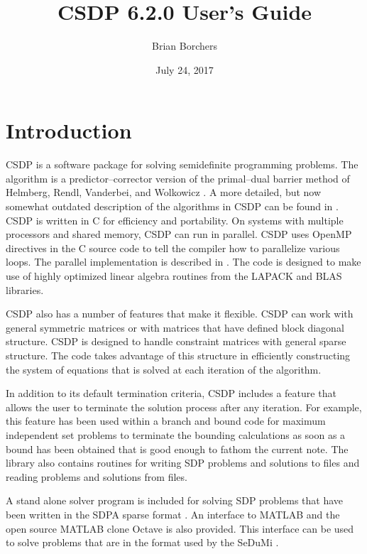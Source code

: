 \documentclass{article}
\begin{document}
\title{CSDP 6.2.0 User's Guide}
\date{July 24, 2017}
\author{Brian Borchers}
\maketitle
\section*{Introduction}
CSDP is a software package for solving semidefinite programming
problems.  The algorithm is a predictor--corrector version of the
primal--dual barrier method of Helmberg, Rendl, Vanderbei, and
Wolkowicz \cite{HelmbergC:Anims}.  A more detailed, but now somewhat
outdated description of the algorithms in CSDP can be found in
\cite{BorchersB:CSDCls}.  CSDP is written in C for efficiency and
portability.  On systems with multiple processors and shared memory,
CSDP can run in parallel.  CSDP uses OpenMP directives in the C source
code to tell the compiler how to parallelize various loops.  The
parallel implementation is described in
\cite{borchers2007implementation}.  The code is designed to make use
of highly optimized linear algebra routines from the LAPACK and BLAS
libraries.

CSDP also has a number of features that make it flexible.  CSDP
can work with general symmetric matrices or with matrices that have
defined block diagonal structure.  CSDP is designed to handle
constraint matrices with general sparse structure.  The code takes
advantage of this structure in efficiently constructing the system of
equations that is solved at each iteration of the algorithm.  

In addition to its default termination criteria, CSDP includes a
feature that allows the user to terminate the solution process after
any iteration.  For example, this feature has been used within a
branch and bound code for maximum independent set problems to
terminate the bounding calculations as soon as a bound has been
obtained that is good enough to fathom the current note.  The library
also contains routines for writing SDP problems and solutions to files
and reading problems and solutions from files.

A stand alone solver program is included for solving SDP problems that
have been written in the SDPA sparse format \cite{SDPA}.  An interface
to MATLAB and the open source MATLAB clone Octave is also provided.
This interface can be used to solve problems that are in the format
used by the SeDuMi \cite{SturmJF:UsiS1M}.
\end{document}
